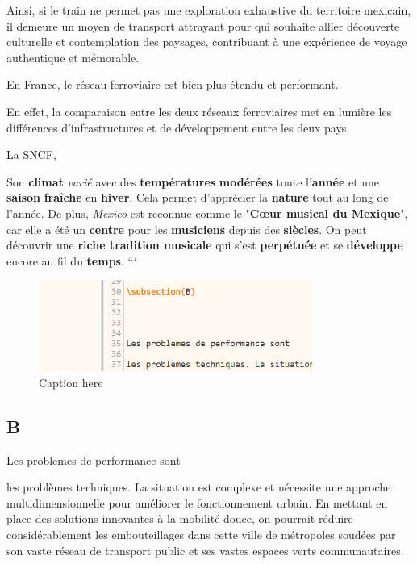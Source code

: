\documentclass[12pt, a4paper]{article}
\begin{document}
Ainsi, si le train ne permet pas une exploration exhaustive du territoire mexicain, il demeure un moyen de transport attrayant pour qui souhaite allier découverte culturelle et contemplation des paysages, contribuant à une expérience de voyage authentique et mémorable.

En France, le réseau ferroviaire est bien plus étendu et performant.

En effet, la comparaison entre les deux réseaux ferroviaires met en lumière les différences d'infrastructures et de développement entre les deux pays.

La SNCF, 

Son \textbf{climat} \textit{varié} avec des \textbf{températures} \textbf{modérées} toute l’\textbf{année} et une \textbf{saison} \textbf{fraîche} en \textbf{hiver}. Cela permet d’apprécier la \textbf{nature} tout au long de l’année. De plus, \textit{Mexico} est reconnue comme le "\textbf{Cœur musical du Mexique}", car elle a été un \textbf{centre} pour les \textbf{musiciens} depuis des \textbf{siècles}. On peut découvrir une \textbf{riche tradition musicale} qui s’est \textbf{perpétuée} et se \textbf{développe} encore au fil du \textbf{temps}.
```


\begin{figure}[h!]
    \centering
    \includegraphics[width=0.8\textwidth]{figures/mexico_city/general_escobedo/default/fig_1.png}
    \caption{Caption here}
    \label{fig:mexico_city_general_escobedo_1}
\end{figure}


\subsection{B}




Les problemes de performance sont 

les problèmes techniques. La situation est complexe et nécessite une approche multidimensionnelle pour améliorer le fonctionnement urbain. En mettant en place des solutions innovantes à la mobilité douce, on pourrait réduire considérablement les embouteillages dans cette ville de métropoles soudées par son vaste réseau de transport public et ses vastes espaces verts communautaires.
\end{document}
